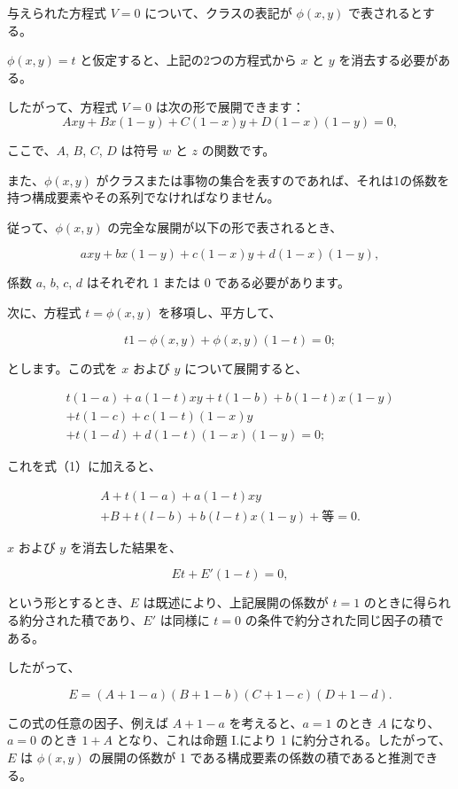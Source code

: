 \documentclass[a4paper,11pt,openany]{ltjsbook}
\begin{document}
与えられた方程式 $V=0$ について、クラスの表記が $\phi (x,y)$ で表されるとする。

$\phi (x,y)=t$ と仮定すると、上記の2つの方程式から $x$ と $y$ を消去する必要がある。

したがって、方程式 $V=0$ は次の形で展開できます：
\setcounter{equation}{0}
\begin{equation}
Axy + Bx(1-y) + C(1-x)y + D(1-x)(1-y) = 0,
\end{equation}

ここで、$A$, $B$, $C$, $D$ は符号 $w$ と $z$ の関数です。

また、$\phi (x,y)$ がクラスまたは事物の集合を表すのであれば、それは1の係数を持つ構成要素やその系列でなければなりません。

従って、$\phi(x, y)$ の完全な展開が以下の形で表されるとき、

\[
axy + bx(1 - y) + c(1 - x)y + d(1 - x)(1 - y),
\]

係数 $a$, $b$, $c$, $d$ はそれぞれ 1 または 0 である必要があります。

次に、方程式 $t = \phi(x, y)$ を移項し、平方して、

\[
t{1-\phi(x,y)} + \phi(x,y)(1-t) = 0;
\]

とします。この式を $x$ および $y$ について展開すると、

\begin{eqnarray*}
{t(1 -a ) + a (1 - t)} xy + {t(1 - b) + b(1 - t)} x(1 - y) \\
+ {t(1-c) + c(1-t)} (1-x)y\\
+ {t(1-d) + d(1-t)} (1-x) (1-y) = 0;
\end{eqnarray*}

これを式（1）に加えると、

\begin{eqnarray*}
{A + t(1-a) + a(1-t)}xy\\
+ {B + t(l-b) + b(l-t)} x(1-y) + 等 = 0.
\end{eqnarray*}

$x$ および $y$ を消去した結果を、

\[
Et+E' (1-t)=0,
\]

という形とするとき、$E$ は既述により、上記展開の係数が $t = 1$ のときに得られる約分された積であり、$E'$ は同様に $t = 0$ の条件で約分された同じ因子の積である。

したがって、

\[
E = (A+1-a)(B+1-b)(C+1-c)(D+1-d).
\]

この式の任意の因子、例えば $A + 1 - a$ を考えると、$a = 1$ のとき $A$ になり、$a = 0$ のとき $1 + A$ となり、これは命題 I.により 1 に約分される。したがって、$E$ は $\phi(x, y)$ の展開の係数が 1 である構成要素の係数の積であると推測できる。
\end{document}
